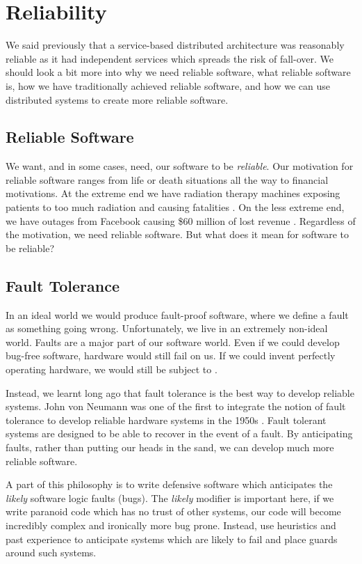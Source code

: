 \section{Reliability}
We said previously that a service-based distributed architecture was reasonably reliable as it had independent services which spreads the risk of fall-over.
We should look a bit more into why we need reliable software,
what reliable software is,
how we have traditionally achieved reliable software,
and how we can use distributed systems to create more reliable software.

\subsection{Reliable Software}
We want, and in some cases, need, our software to be \textsl{reliable}.
Our motivation for reliable software ranges from life or death situations all the way to financial motivations.
At the extreme end we have radiation therapy machines exposing patients to too much radiation and causing fatalities \cite{therac}.
On the less extreme end,
we have outages from Facebook causing \$60 million of lost revenue \cite{facebook-outage}.
Regardless of the motivation,
we need reliable software.
But what does it mean for software to be reliable?

\subsection{Fault Tolerance}
In an ideal world we would produce fault-proof software,
where we define a fault as something going wrong.
Unfortunately, we live in an extremely non-ideal world.
Faults are a major part of our software world.
Even if we could develop bug-free software,
hardware would still fail on us.
If we could invent perfectly operating hardware,
we would still be subject to .

Instead, we learnt long ago that fault tolerance is the best way to develop reliable systems.
John von Neumann was one of the first to integrate the notion of fault tolerance to develop reliable hardware systems in the 1950s \cite{neumann-faults}.
Fault tolerant systems are designed to be able to recover in the event of a fault.
By anticipating faults, rather than putting our heads in the sand,
we can develop much more reliable software.

A part of this philosophy is to write defensive software which anticipates the \textsl{likely} software logic faults (bugs).
The \textsl{likely} modifier is important here,
if we write paranoid code which has no trust of other systems,
our code will become incredibly complex and ironically more bug prone.
Instead, use heuristics and past experience to anticipate systems which are likely to fail and place guards around such systems.

